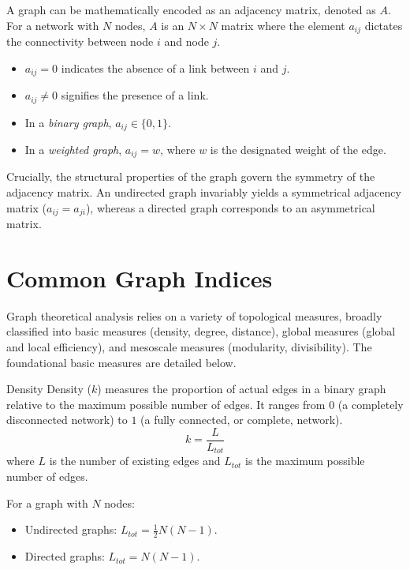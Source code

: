 \documentclass[10pt, letterpaper]{report}
\begin{document}
A graph can be mathematically encoded as an adjacency matrix, denoted as $A$. For a network with $N$ nodes, $A$ is an $N \times N$ matrix where the element $a_{ij}$ dictates the connectivity between node $i$ and node $j$.
\begin{itemize}
    \item $a_{ij} = 0$ indicates the absence of a link between $i$ and $j$.
    \item $a_{ij} \neq 0$ signifies the presence of a link.
    \item In a \textit{binary graph}, $a_{ij} \in \{0, 1\}$.
    \item In a \textit{weighted graph}, $a_{ij} = w$, where $w$ is the designated weight of the edge.
\end{itemize}
Crucially, the structural properties of the graph govern the symmetry of the adjacency matrix. An undirected graph invariably yields a symmetrical adjacency matrix ($a_{ij} = a_{ji}$), whereas a directed graph corresponds to an asymmetrical matrix.

\section{Common Graph Indices}
Graph theoretical analysis relies on a variety of topological measures, broadly classified into basic measures (density, degree, distance), global measures (global and local efficiency), and mesoscale measures (modularity, divisibility). The foundational basic measures are detailed below.

\begin{boxdefinition}{Density}{}
Density ($k$) measures the proportion of actual edges in a binary graph relative to the maximum possible number of edges. It ranges from $0$ (a completely disconnected network) to $1$ (a fully connected, or complete, network).
\begin{equation}
    k = \frac{L}{L_{tot}}
\end{equation}
where $L$ is the number of existing edges and $L_{tot}$ is the maximum possible number of edges.
\end{boxdefinition}
\noindent For a graph with $N$ nodes:
\begin{itemize}
    \item Undirected graphs: $L_{tot} = \frac{1}{2}N(N-1)$.
    \item Directed graphs: $L_{tot} = N(N-1)$.
\end{itemize}
\end{document}
